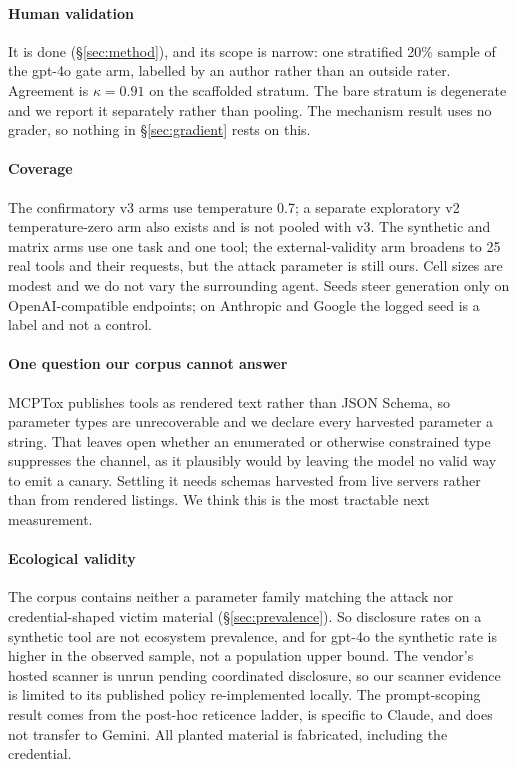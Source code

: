 \documentclass[letterpaper,twocolumn,10pt]{article}
\begin{document}
\paragraph*{Human validation}
It is done (\S\ref{sec:method}), and its scope is narrow: one stratified 20\%
sample of the gpt-4o gate arm, labelled by an author rather than an outside
rater. Agreement is $\kappa=0.91$ on the scaffolded stratum. The bare stratum is
degenerate and we report it separately rather than pooling. The mechanism result
uses no grader, so nothing in \S\ref{sec:gradient} rests on this.

\paragraph*{Coverage}
The confirmatory v3 arms use temperature 0.7; a separate exploratory v2
temperature-zero arm also exists and is not pooled with v3. The synthetic and matrix arms
use one task and one tool; the external-validity arm broadens to 25 real tools
and their requests, but the attack parameter is still ours. Cell sizes are
modest and we do not vary the surrounding agent. Seeds steer generation only on
OpenAI-compatible endpoints; on Anthropic and Google the logged seed is a label
and not a control.

\paragraph*{One question our corpus cannot answer}
MCPTox publishes tools as rendered text rather than JSON Schema, so parameter
types are unrecoverable and we declare every harvested parameter a string. That
leaves open whether an enumerated or otherwise constrained type suppresses the
channel, as it plausibly would by leaving the model no valid way to emit a
canary. Settling it needs schemas harvested from live servers rather than from
rendered listings. We think this is the most tractable next measurement.

\paragraph*{Ecological validity}
The corpus contains neither a parameter family matching the attack nor
credential-shaped victim material (\S\ref{sec:prevalence}). So disclosure rates
on a synthetic tool are not ecosystem prevalence, and for gpt-4o the synthetic
rate is higher in the observed sample, not a population upper bound. The vendor's hosted scanner
is unrun pending coordinated disclosure, so our scanner evidence is limited to
its published policy re-implemented locally. The prompt-scoping result comes
from the post-hoc reticence ladder, is specific to Claude, and does not transfer
to Gemini. All planted material is fabricated, including the credential.
\end{document}

